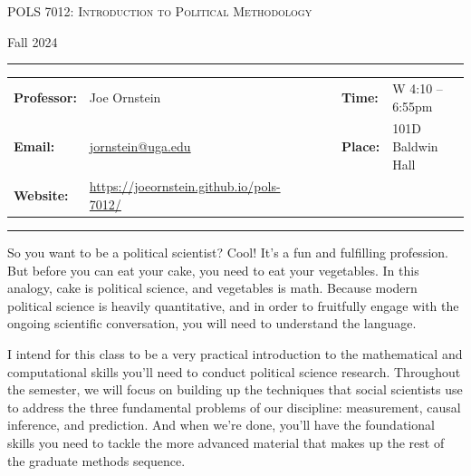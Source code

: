 \documentclass[11pt, letterpaper]{article}
\begin{document}
\begin{center}
{\Large \textsc{POLS 7012: Introduction to Political Methodology}}
\end{center}
\begin{center}
{\large Fall 2024}
\end{center}

\begin{center}
\rule{6.5in}{0.4pt}
\begin{minipage}[t]{.96\textwidth}
\begin{tabular}{llcccll}
\textbf{Professor:} & Joe Ornstein & & &  & \textbf{Time:} & W 4:10 -- 6:55pm \\
\textbf{Email:} &  \href{mailto:jornstein@uga.edu}{jornstein@uga.edu} & & & & \textbf{Place:} & 101D Baldwin Hall\\
\textbf{Website:} & \href{https://joeornstein.github.io/pols-7012/}{https://joeornstein.github.io/pols-7012/} & & & & &
\end{tabular}
\end{minipage}
\rule{6.5in}{0.4pt}
\end{center}
\vspace{.15cm}
\setlength{\unitlength}{1in}
\renewcommand{\arraystretch}{2}


\noindent So you want to be a political scientist? Cool! It's a fun and fulfilling profession. But before you can eat your cake, you need to eat your vegetables. In this analogy, cake is political science, and vegetables is math. Because modern political science is heavily quantitative, and in order to fruitfully engage with the ongoing scientific conversation, you will need to understand the language. 

I intend for this class to be a very practical introduction to the mathematical and computational skills you'll need to conduct political science research. Throughout the semester, we will focus on building up the techniques that social scientists use to address the three fundamental problems of our discipline: measurement, causal inference, and prediction. And when we're done, you'll have the foundational skills you need to tackle the more advanced material that makes up the rest of the graduate methods sequence. %
\end{document}
